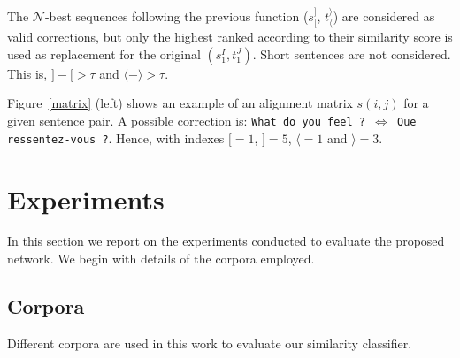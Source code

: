 \documentclass[11pt,a4paper]{article}
\begin{document}
The $\mathcal{N}$-best sequences following the previous function ($s_[^]$, $t_\langle^\rangle$) are considered as valid corrections, but only the highest ranked according to their similarity score is used as replacement for the original $(s_1^I, t_1^J)$. %
Short sentences are not considered. This is, $] - [ > \tau$ and $\langle - \rangle > \tau$. 

Figure~\ref{matrix} (left) shows an example of an alignment matrix $s(i,j)$ for a given sentence pair. A possible correction is: \texttt{What do you feel ? $\Leftrightarrow$ Que ressentez-vous ?}. Hence, with indexes $[=1$, $]=5$, $\langle=1$ and $\rangle=3$.



\section{Experiments}
\label{experiments}

In this section we report on the experiments conducted to evaluate the proposed network. We begin with details of the corpora employed.

\subsection{Corpora}
\label{corpora}

Different corpora are used in this work to evaluate our similarity classifier.
\end{document}
